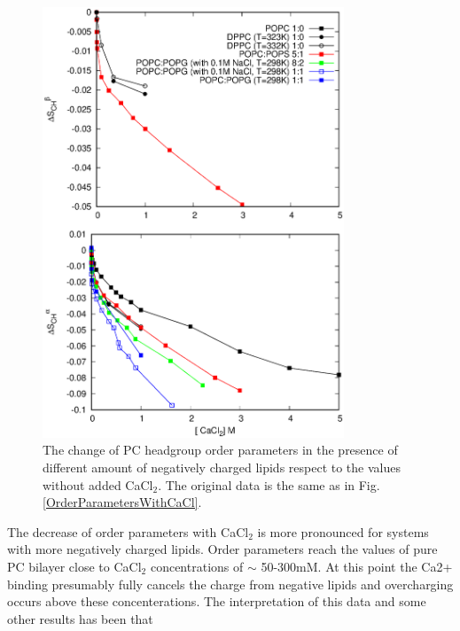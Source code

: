 \documentclass[aps,prl,superscriptaddress,twocolumn]{revtex4}
\begin{document}
\begin{figure}[]
  \centering
  \includegraphics[width=9.0cm]{../Figs/CHANGESwithCaCl.eps}
  \caption{\label{OrderParameterCHANGESWithCaClBELOW1M}
    The change of PC headgroup order parameters
    in the presence of different amount of negatively charged lipids
    respect to the values without added CaCl$_2$.
    The original data is the same as in Fig. \ref{OrderParametersWithCaCl}. 
  }
\end{figure}
The decrease of order parameters with CaCl$_2$
is more pronounced for systems with more
negatively charged lipids.%
Order parameters reach the values of pure PC bilayer close to CaCl$_2$ concentrations of $\sim$ 50-300mM.
At this point the Ca2+ binding presumably fully cancels the charge from negative lipids and
overcharging occurs above these concenterations.
The interpretation of this data and some other results has been that \cite{seelig90}
\end{document}

